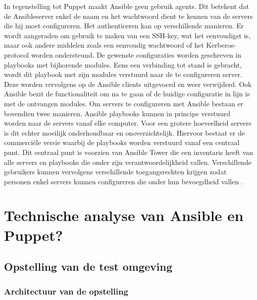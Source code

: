 In tegenstelling tot Puppet maakt Ansible geen gebruik agents. Dit betekent dat de Ansibleserver enkel de naam en het wachtwoord dient te kennen van de servers die hij moet configureren. Het authenticeren kan op verschillende manieren. Er wordt aangeraden om gebruik te maken van een SSH-key, wat het eenvoudigst is, maar ook andere middelen zoals een eenvoudig wachtwoord of het Kerberos-protocol worden ondersteund. De gewenste configuraties worden geschreven in playbooks met bijhorende modules. Eens een verbinding tot stand is gebracht, wordt dit playbook met zijn modules verstuurd naar de te configureren server. Deze worden vervolgens op de Ansible clients uitgevoerd  en weer verwijderd. Ook Ansible bezit de functionaliteit om na te gaan of de huidige configuratie in lijn is met de ontvangen modules. Om servers te configureren met Ansible bestaan er bovendien twee manieren. Ansible playbooks kunnen in principe verstuurd worden naar de servers vanaf elke computer. Voor een grotere hoeveelheid servers is dit echter moeilijk onderhoudbaar en onoverzichtelijk. Hiervoor bestaat er de commerci\"ele versie waarbij de playbooks worden verstuurd vanaf een centraal punt. Dit centraal punt is voorzien van Ansible Tower die een inventaris heeft van alle servers en playbooks die onder zijn verantwoordelijkheid vallen. Verschillende gebruikers kunnen vervolgens verschillende toegangsrechten krijgen zodat personen enkel servers kunnen configureren die onder hun bevoegdheid vallen \autocite{ansibledoc}.


\section{Technische analyse van Ansible en Puppet?}
\label{sec:technischeanalyse}
\subsection{Opstelling van de test omgeving}
\label{sec:opstellingtestevn}
\subsubsection{Architectuur van de opstelling}


